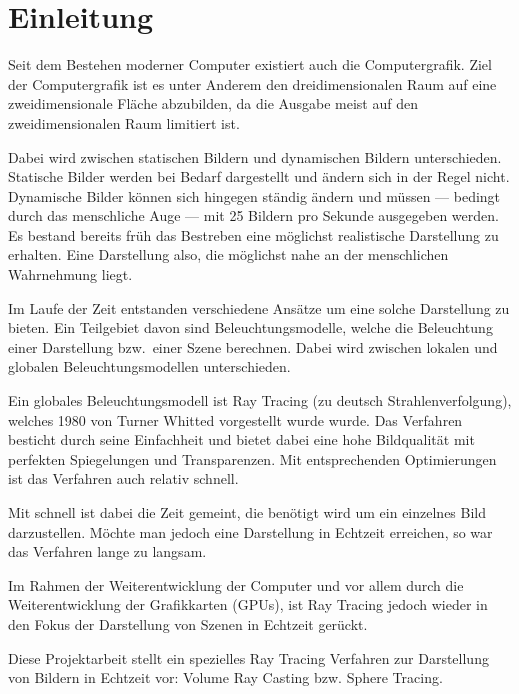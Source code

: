 
\chapter{Einleitung}
\label{chap:10_introduction}

Seit dem Bestehen moderner Computer existiert auch die Computergrafik. Ziel der Computergrafik ist es unter Anderem den dreidimensionalen Raum auf eine zweidimensionale Fläche abzubilden, da die Ausgabe meist auf den zweidimensionalen Raum limitiert ist.

Dabei wird zwischen statischen Bildern und dynamischen Bildern unterschieden. Statische Bilder werden bei Bedarf dargestellt und ändern sich in der Regel nicht. Dynamische Bilder können sich hingegen ständig ändern und müssen --- bedingt durch das menschliche Auge --- mit 25 Bildern pro Sekunde ausgegeben werden. Es bestand bereits früh das Bestreben eine möglichst realistische Darstellung zu erhalten. Eine Darstellung also, die möglichst nahe an der menschlichen Wahrnehmung liegt.

Im Laufe der Zeit entstanden verschiedene Ansätze um eine solche Darstellung zu bieten. Ein Teilgebiet davon sind Beleuchtungsmodelle, welche die Beleuchtung einer Darstellung bzw.\ einer Szene berechnen. Dabei wird zwischen lokalen und globalen Beleuchtungsmodellen unterschieden.

Ein globales Beleuchtungsmodell ist Ray Tracing (zu deutsch Strahlenverfolgung), welches 1980 von Turner Whitted vorgestellt wurde wurde. Das Verfahren besticht durch seine Einfachheit und bietet dabei eine hohe Bildqualität mit perfekten Spiegelungen und Transparenzen. Mit entsprechenden Optimierungen ist das Verfahren auch relativ schnell.

Mit schnell ist dabei die Zeit gemeint, die benötigt wird um ein einzelnes Bild darzustellen. Möchte man jedoch eine Darstellung in Echtzeit erreichen, so war das Verfahren lange zu langsam.

Im Rahmen der Weiterentwicklung der Computer und vor allem durch die Weiterentwicklung der Grafikkarten (GPUs), ist Ray Tracing jedoch wieder in den Fokus der Darstellung von Szenen in Echtzeit gerückt.

Diese Projektarbeit stellt ein spezielles Ray Tracing Verfahren zur Darstellung von Bildern in Echtzeit vor: Volume Ray Casting bzw. Sphere Tracing.

